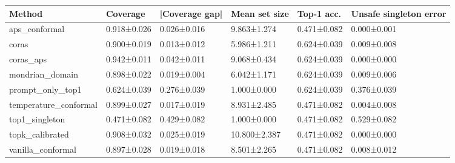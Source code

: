 \begin{tabular}{llllll}
\toprule
Method & Coverage & |Coverage gap| & Mean set size & Top-1 acc. & Unsafe singleton error \\
\midrule
aps\_conformal & 0.918±0.026 & 0.026±0.016 & 9.863±1.274 & 0.471±0.082 & 0.000±0.001 \\
coras & 0.900±0.019 & 0.013±0.012 & 5.986±1.211 & 0.624±0.039 & 0.009±0.008 \\
coras\_aps & 0.942±0.011 & 0.042±0.011 & 9.068±0.434 & 0.624±0.039 & 0.000±0.000 \\
mondrian\_domain & 0.898±0.022 & 0.019±0.004 & 6.042±1.171 & 0.624±0.039 & 0.009±0.006 \\
prompt\_only\_top1 & 0.624±0.039 & 0.276±0.039 & 1.000±0.000 & 0.624±0.039 & 0.376±0.039 \\
temperature\_conformal & 0.899±0.027 & 0.017±0.019 & 8.931±2.485 & 0.471±0.082 & 0.004±0.008 \\
top1\_singleton & 0.471±0.082 & 0.429±0.082 & 1.000±0.000 & 0.471±0.082 & 0.529±0.082 \\
topk\_calibrated & 0.908±0.032 & 0.025±0.019 & 10.800±2.387 & 0.471±0.082 & 0.000±0.000 \\
vanilla\_conformal & 0.897±0.028 & 0.019±0.018 & 8.501±2.265 & 0.471±0.082 & 0.008±0.012 \\
\bottomrule
\end{tabular}
